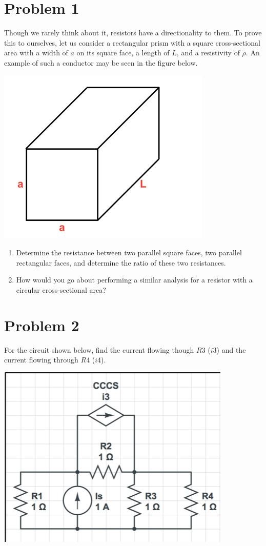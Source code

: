 \documentclass[11pt]{book}
\begin{document}
\section{Problem 1}
Though we rarely think about it, resistors have a directionality to them. To prove this to ourselves, let us consider a rectangular prism with a square cross-sectional area with a width of $a$ on its square face, a length of $L$, and a resistivity of $\rho$. An example of such a conductor may be seen in the figure below.
\begin{center}
	\includegraphics{figures/hw2.01.png}
\end{center}
\begin{enumerate}
	\item Determine the resistance between two parallel square faces, two parallel rectangular faces, and determine the ratio of these two resistances.
	\item How would you go about performing a similar analysis for a resistor with a circular cross-sectional area? 
\end{enumerate}



\section{Problem 2}
For the circuit shown below, find the current flowing though $R3$ ($i3$) and the current flowing through $R4$ ($i4$). 
\begin{center}
	\includegraphics{figures/hw2.02.png}
\end{center}
\end{document}
